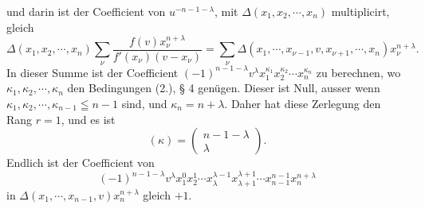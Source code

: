 \documentclass[11pt]{article}
\begin{document}
und darin ist der Coefficient von $u^{-n-1-
\lambda}$, mit $\Delta(x_1,x_2,
\cdots,x_n)$ multiplicirt, gleich
\[
 \Delta(x_1,x_2,
\cdots,x_n)\sum_\nu\frac{f(v)x_\nu^{n+\lambda}}{f'(x_\nu)(v-x_\nu)}
 =\sum_\nu\Delta(x_1,
\cdots,x_{\nu-1},v,x_{\nu+1},
\cdots,x_n)x_\nu^{n+
\lambda}.
\]
In dieser Summe ist der Coefficient $(-1)^{n-1-
\lambda}v^\lambda x_1^{\kappa_1}x_2^{\kappa_2}\cdots x_n^{\kappa_n}$ zu berechnen, wo $\kappa_1,
\kappa_2,
\cdots,
\kappa_n$ den Bedingungen (2.), § 4 genügen. Dieser ist Null, ausser wenn $\kappa_1,
\kappa_2,
\cdots,
\kappa_{n-1}\leqq n-1$ sind, und $\kappa_n=n+
\lambda$. Daher hat diese Zerlegung den Rang $r=1$, und es ist
\[
 (\kappa)=\left(\begin{matrix}n-1-
\lambda\\ \lambda\end{matrix}\right).
\]
Endlich ist der Coefficient von
\[
 (-1)^{n-1-
\lambda}v^\lambda x_1^0x_2^1\cdots x_\lambda^{\lambda-1}x_{\lambda+1}^{\lambda+1}\cdots x_{n-1}^{n-1}x_n^{n+
\lambda}
\]
in $\Delta(x_1,
\cdots,x_{n-1},v)x_n^{n+
\lambda}$ gleich $+1$.
\end{document}
